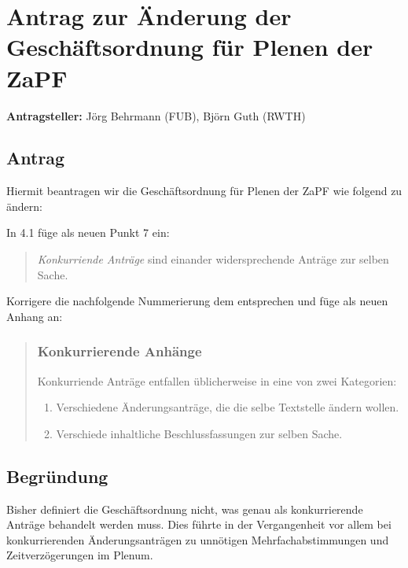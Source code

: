 \documentclass[draft,10pt,oneside]{scrartcl}
\begin{document}
\section*{Antrag zur Änderung der Geschäftsordnung für Plenen der ZaPF}

\textbf{Antragsteller:} Jörg Behrmann (FUB), Björn Guth (RWTH)

\subsection*{Antrag}

Hiermit beantragen wir die Geschäftsordnung für Plenen der ZaPF wie folgend zu
ändern:

In 4.1 füge als neuen Punkt 7 ein:
\begin{quote}
	\textit{Konkurriende Anträge} sind einander widersprechende Anträge zur
	selben Sache.
\end{quote}
Korrigere die nachfolgende Nummerierung dem entsprechen und füge als neuen
Anhang an:
\begin{quote}
	\subsubsection*{Konkurrierende Anhänge}
	Konkurriende Anträge entfallen üblicherweise in eine von zwei Kategorien:
	\begin{enumerate}
		\item Verschiedene Änderungsanträge, die die selbe Textstelle ändern
			wollen.
		\item Verschiede inhaltliche Beschlussfassungen zur selben Sache.
	\end{enumerate}
\end{quote}

\subsection*{Begründung}
Bisher definiert die Geschäftsordnung nicht, was genau als konkurrierende
Anträge behandelt werden muss. Dies führte in der Vergangenheit vor allem bei
konkurrierenden Änderungsanträgen zu unnötigen Mehrfachabstimmungen und
Zeitverzögerungen im Plenum.
\end{document}
